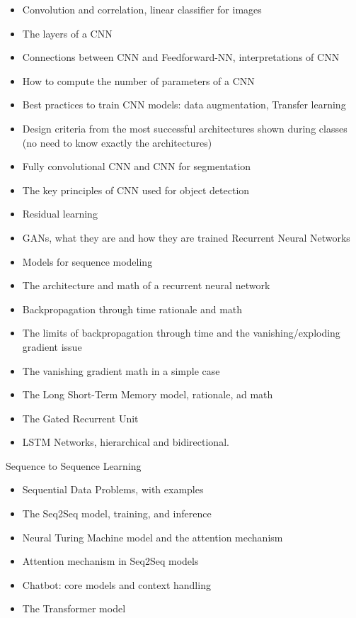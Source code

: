 \begin{itemize}
    \item Convolution and correlation, linear classifier for images
    \item The layers of a CNN
    \item Connections between CNN and Feedforward-NN, interpretations of CNN
    \item How to compute the number of parameters of a CNN
    \item Best practices to train CNN models: data augmentation, Transfer learning
    \item Design criteria from the most successful architectures shown during classes (no need to
    know exactly the architectures)
    \item Fully convolutional CNN and CNN for segmentation
    \item The key principles of CNN used for object detection
    \item Residual learning
    \item GANs, what they are and how they are trained
    Recurrent Neural Networks
    \item Models for sequence modeling
    \item The architecture and math of a recurrent neural network
    \item Backpropagation through time rationale and math
    \item The limits of backpropagation through time and the vanishing/exploding gradient issue
    \item The vanishing gradient math in a simple case
    \item The Long Short-Term Memory model, rationale, ad math
    \item The Gated Recurrent Unit
    \item LSTM Networks, hierarchical and bidirectional.
\end{itemize}
Sequence to Sequence Learning
\begin{itemize}
    \item Sequential Data Problems, with examples
    \item The Seq2Seq model, training, and inference
    \item Neural Turing Machine model and the attention mechanism
    \item Attention mechanism in Seq2Seq models
    \item Chatbot: core models and context handling
    \item The Transformer model
\end{itemize}
